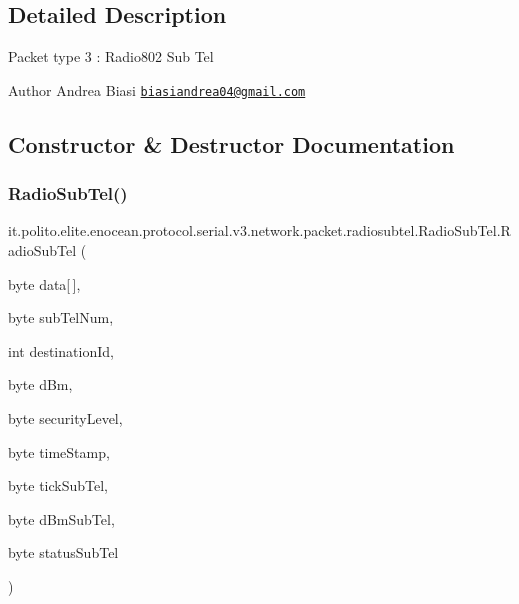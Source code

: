 \subsection{Detailed Description}
Packet type 3 \+: Radio802 Sub Tel

\begin{DoxyAuthor}{Author}
Andrea Biasi \href{mailto:biasiandrea04@gmail.com}{\tt biasiandrea04@gmail.\+com} 
\end{DoxyAuthor}


\subsection{Constructor \& Destructor Documentation}
\hypertarget{classit_1_1polito_1_1elite_1_1enocean_1_1protocol_1_1serial_1_1v3_1_1network_1_1packet_1_1radiosubtel_1_1_radio_sub_tel_a08883ebe700df5f64a8faa126876e5b7}{}\label{classit_1_1polito_1_1elite_1_1enocean_1_1protocol_1_1serial_1_1v3_1_1network_1_1packet_1_1radiosubtel_1_1_radio_sub_tel_a08883ebe700df5f64a8faa126876e5b7} 
\subsubsection{\texorpdfstring{Radio\+Sub\+Tel()}{RadioSubTel()}}
{\footnotesize\ttfamily it.\+polito.\+elite.\+enocean.\+protocol.\+serial.\+v3.\+network.\+packet.\+radiosubtel.\+Radio\+Sub\+Tel.\+Radio\+Sub\+Tel (\begin{DoxyParamCaption}\item[{byte}]{data\mbox{[}$\,$\mbox{]},  }\item[{byte}]{sub\+Tel\+Num,  }\item[{int}]{destination\+Id,  }\item[{byte}]{d\+Bm,  }\item[{byte}]{security\+Level,  }\item[{byte}]{time\+Stamp,  }\item[{byte}]{tick\+Sub\+Tel,  }\item[{byte}]{d\+Bm\+Sub\+Tel,  }\item[{byte}]{status\+Sub\+Tel }\end{DoxyParamCaption})}


